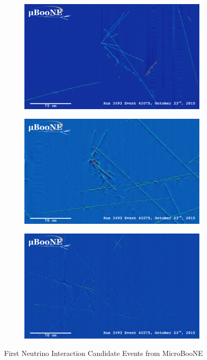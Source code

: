 \begin{figure}[htp!]
\centering
	\begin{subfigure}[b]{.8\textwidth}
	\includegraphics[width=\textwidth]{figs/first_neutrino_pdfs/run3493_subrun821_event41075_col.pdf}
	\end{subfigure}
	\quad
	\begin{subfigure}[b]{.8\textwidth}
	\includegraphics[width=\textwidth]{figs/first_neutrino_pdfs/run3493_subrun821_event41075_ind0.pdf}
	\end{subfigure}
	\quad
	\begin{subfigure}[b]{.8\textwidth}
	\includegraphics[width=\textwidth]{figs/first_neutrino_pdfs/run3493_subrun821_event41075_ind1.pdf}
	\end{subfigure}
	\quad
\caption{First Neutrino Interaction Candidate Events from MicroBooNE}
\label{fig:3dimage}
\end{figure}
